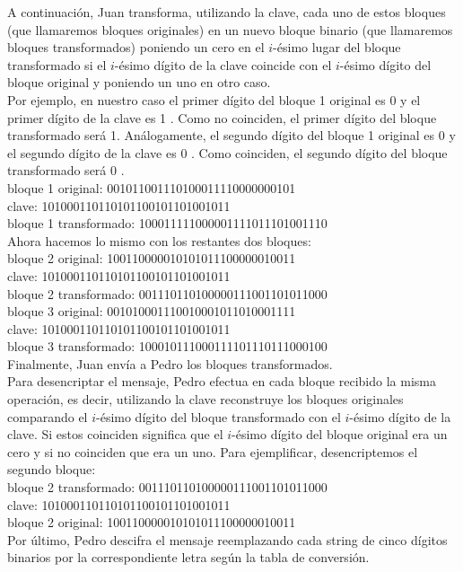 \documentclass[10pt]{article}
\begin{document}
A continuación, Juan transforma, utilizando la clave, cada uno de estos bloques (que llamaremos bloques originales) en un nuevo bloque binario (que llamaremos bloques transformados) poniendo un cero en el $i$-ésimo lugar del bloque transformado si el $i$-ésimo dígito de la clave coincide con el $i$-ésimo dígito del bloque original y poniendo un uno en otro caso.\\
Por ejemplo, en nuestro caso el primer dígito del bloque 1 original es 0 y el primer dígito de la clave es 1 . Como no coinciden, el primer dígito del bloque transformado será 1. Análogamente, el segundo dígito del bloque 1 original es 0 y el segundo dígito de la clave es 0 . Como coinciden, el segundo dígito del bloque transformado será 0 .\\
bloque 1 original: 001011001110100011110000000101\\
clave: 101000110110101100101101001011\\
bloque 1 transformado: 100011111000001111011101001110\\
Ahora hacemos lo mismo con los restantes dos bloques:\\
bloque 2 original: 100110000010101011100000010011\\
clave: 101000110110101100101101001011\\
bloque 2 transformado: 001110110100000111001101011000\\
bloque 3 original: 001010001110010001011010001111\\
clave: 101000110110101100101101001011\\
bloque 3 transformado: 100010111000111101110111000100\\
Finalmente, Juan envía a Pedro los bloques transformados.\\
Para desencriptar el mensaje, Pedro efectua en cada bloque recibido la misma operación, es decir, utilizando la clave reconstruye los bloques originales comparando el $i$-ésimo dígito del bloque transformado con el $i$-ésimo dígito de la clave. Si estos coinciden significa que el $i$-ésimo dígito del bloque original era un cero y si no coinciden que era un uno. Para ejemplificar, desencriptemos el segundo bloque:\\
bloque 2 transformado: 001110110100000111001101011000\\
clave: 101000110110101100101101001011\\
bloque 2 original: 100110000010101011100000010011\\
Por último, Pedro descifra el mensaje reemplazando cada string de cinco dígitos binarios por la correspondiente letra según la tabla de conversión.
\end{document}
